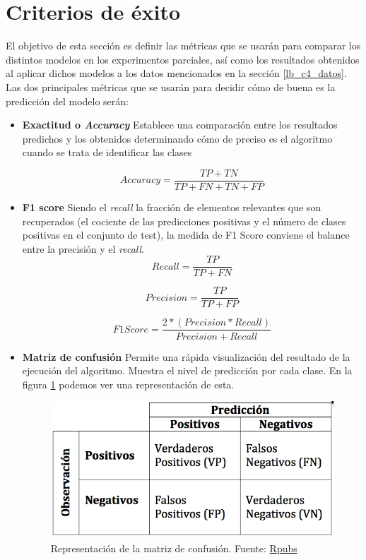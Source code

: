 \documentclass[11pt,a4paper,spanish]{book}
\begin{document}
	\section{Criterios de éxito}
	El objetivo de esta sección es definir las métricas que se usarán para comparar los distintos modelos en los experimentos parciales, así como los resultados obtenidos al aplicar dichos modelos a los datos mencionados en la sección \ref{lb_c4_datos}.\\
	Las dos principales métricas que se usarán para decidir cómo de buena es la predicción del modelo serán:
	\begin{itemize}
		\item \textbf{Exactitud o \emph{Accuracy} } Establece una comparación entre los resultados predichos y los obtenidos determinando cómo de preciso es el algoritmo cuando se trata de identificar las clases
		
			\[
				Accuracy = \frac{TP + TN}{ TP + FN + TN + FP} 
			\]
 			\hfill \break

		\item \textbf{F1 score} Siendo el \emph{recall} la fracción de elementos relevantes que son recuperados (el cociente de las predicciones positivas y el número de clases positivas en el conjunto de test), la medida de F1 Score conviene el balance entre la precisión y el \emph{recall}.
		\[
			Recall = \frac{TP}{ TP + FN} 
		\]
		
		\[
			Precision = \frac{TP}{TP + FP}
		\]
		
		\[
			F1 Score = \frac{2 * (Precision * Recall)}{Precision + Recall}
		\]
		\hfill \break
		
		\item \textbf{Matriz de confusión} Permite una rápida visualización del resultado de la ejecución del algoritmo. Muestra el nivel de predicción por cada clase. En la figura \ref{fig:confusionMatrix} podemos ver una representación de esta.
		
		\begin{figure}[h]
			\centering
			\includegraphics[scale=0.3]{confusionMatrix.png}
			\caption{Representación de la matriz de confusión. Fuente: \href{https://rpubs.com/chzelada/275494}{Rpubs}}
			\label{fig:confusionMatrix}
		\end{figure}
	
	\end{itemize}
\end{document}
